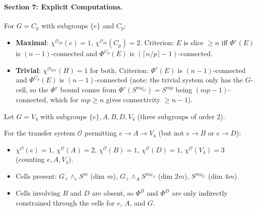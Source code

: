 
\paragraph{Section 7: Explicit Computations.}

\begin{proposition}[$G = C_p$, prime cyclic]\label{prop:p5-Cp}
For $G = C_p$ with subgroups $\{e\}$ and $C_p$:
\begin{itemize}
  \item \textbf{Maximal}: $\chi^{\mathcal{O}_{\mathrm{all}}}(e) = 1$,
    $\chi^{\mathcal{O}_{\mathrm{all}}}(C_p) = 2$.
    Criterion: $E$ is slice $\geq n$ iff $\Phi^e(E)$ is $(n-1)$-connected
    and $\Phi^{C_p}(E)$ is $(\lceil n/p \rceil - 1)$-connected.
  \item \textbf{Trivial}: $\chi^{\mathcal{O}_{\mathrm{triv}}}(H) = 1$ for both.
    Criterion: $\Phi^e(E)$ is $(n-1)$-connected and $\Phi^{C_p}(E)$ is
    $(n-1)$-connected (note: the trivial system only has the $G$-cell, so the
    $\Phi^e$ bound comes from $\Phi^e(S^{m\rho_G}) = S^{mp}$ being
    $(mp-1)$-connected, which for $mp \geq n$ gives connectivity $\geq n-1$).
\end{itemize}
\end{proposition}

\begin{proposition}[$G = C_2 \times C_2$, Klein four]\label{prop:p5-V4}
Let $G = V_4$ with subgroups $\{e\}, A, B, D, V_4$ (three subgroups of
order 2).

For the transfer system $\mathcal{O}$ permitting $e \to A \to V_4$ (but not
$e \to B$ or $e \to D$):
\begin{itemize}
  \item $\chi^{\mathcal{O}}(e) = 1$, $\chi^{\mathcal{O}}(A) = 2$,
    $\chi^{\mathcal{O}}(B) = 1$, $\chi^{\mathcal{O}}(D) = 1$,
    $\chi^{\mathcal{O}}(V_4) = 3$ (counting $e, A, V_4$).
  \item Cells present: $G_+ \wedge_e S^m$ (dim $m$),
    $G_+ \wedge_A S^{m\rho_A}$ (dim $2m$), $S^{m\rho_G}$ (dim $4m$).
  \item Cells involving $B$ and $D$ are absent, so $\Phi^B$ and $\Phi^D$
    are only indirectly constrained through the cells for $e$, $A$, and $G$.
\end{itemize}
\end{proposition}

